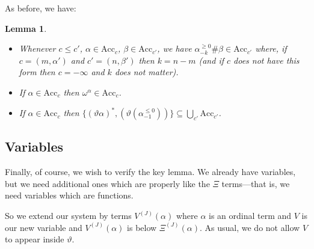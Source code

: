 \documentclass[11pt]{amsart}
\newtheorem{lemma}[theorem]{Lemma}
\theoremstyle{definition}
\begin{document}
As before, we have:
\begin{lemma}
  \begin{itemize}
  \item Whenever $c\leq c'$, $\alpha\in\mathrm{Acc}_c$, $\beta\in\mathrm{Acc}_{c'}$, we have $\alpha^{\geq 0}_{-k}\#\beta\in\mathrm{Acc}_{c'}$ where, if $c=(m,\alpha')$ and $c'=(n,\beta')$ then $k=n-m$ (and if $c$ does not have this form then $c=-\infty$ and $k$ does not matter).
  \item If $\alpha\in\mathrm{Acc}_c$ then $\omega^\alpha\in\mathrm{Acc}_c$.
  \item   If $\alpha\in\mathrm{Acc}_c$ then $\{(\vartheta\alpha)^*,(\vartheta(\alpha^{\leq 0}_{-1}))\}\subseteq\bigcup_{c'}\mathrm{Acc}_{c'}$.
  \end{itemize}
\end{lemma}

\subsection{Variables}

Finally, of course, we wish to verify the key lemma. We already have variables, but we need additional ones which are properly like the $\Xi$ terms---that is, we need variables which are functions.

So we extend our system by terms $V^{(J)}(\alpha)$ where $\alpha$ is an ordinal term and $V$ is our new variable and $V^{(J)}(\alpha)$ is below $\Xi^{(J)}(\alpha)$. As usual, we do not allow $V$ to appear inside $\vartheta$.
\end{document}
